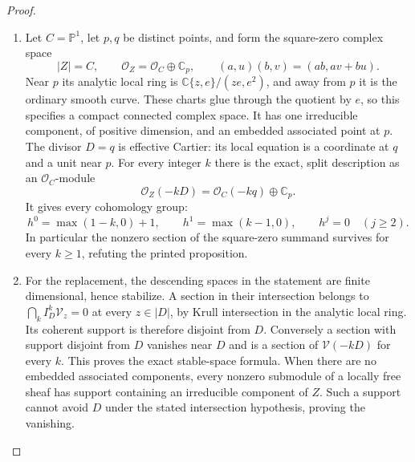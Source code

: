 \begin{proof}

\begin{enumerate}[label={$\langle1\rangle$\arabic*.},leftmargin=*]
\item Let $C=\mathbb P^1$, let $p,q$ be distinct points, and form the
square-zero complex space
\[
 |Z|=C,\qquad\mathcal O_Z=\mathcal O_C\oplus\mathbb C_p,
 \qquad(a,u)(b,v)=(ab,av+bu).
\]
Near $p$ its analytic local ring is
$\mathbb C\{z,e\}/(ze,e^2)$, and away from $p$ it is the
ordinary smooth curve. These charts glue through the quotient
by $e$, so this specifies a compact connected complex space.
It has one irreducible component, of positive dimension, and an
embedded associated point at $p$. The divisor $D=q$ is effective
Cartier: its local equation is a coordinate at $q$ and a unit
near $p$. For every integer $k$ there is the exact, split
description as an $\mathcal O_C$-module
\[
 \mathcal O_Z(-kD)=\mathcal O_C(-kq)\oplus\mathbb C_p.
\]
It gives every cohomology group:
\[
 h^0=\max(1-k,0)+1,\qquad h^1=\max(k-1,0),\qquad
 h^j=0\quad(j\geq2).
\]
In particular the nonzero section of the square-zero summand
survives for every $k\geq1$, refuting the printed proposition.

\item For the replacement, the descending spaces in the statement are
finite dimensional, hence stabilize. A section in their
intersection belongs to $\bigcap_k I_D^k\mathcal V_z=0$ at
every $z\in|D|$, by Krull intersection in the analytic local
ring. Its coherent support is therefore disjoint from $D$.
Conversely a section with support disjoint from $D$ vanishes
near $D$ and is a section of $\mathcal V(-kD)$ for every $k$.
This proves the exact stable-space formula. When there are no
embedded associated components, every nonzero submodule of a
locally free sheaf has support containing an irreducible
component of $Z$. Such a support cannot avoid $D$ under the
stated intersection hypothesis, proving the vanishing.

\end{enumerate}
\end{proof}
